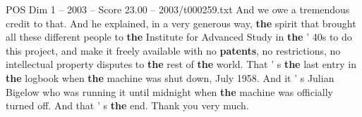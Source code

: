 \begin{textsample}{POS Dim 1 – 2003 – Score 23.00 – 2003/t000259.txt}
And we owe a tremendous credit to that.
And he explained, in a very generous way, \textbf{the} spirit that brought all these different people to \textbf{the} Institute for Advanced Study in \textbf{the} ' 40s to do this project, and make it freely available with no \textbf{patents}, no restrictions, no intellectual property disputes to \textbf{the} rest of \textbf{the} world.
That ' s \textbf{the} last entry in \textbf{the} logbook when \textbf{the} machine was shut down, July 1958.
And it ' s Julian Bigelow who was running it until midnight when \textbf{the} machine was officially turned off.
And that ' s \textbf{the} end.
Thank you very much.

\end{textsample}
